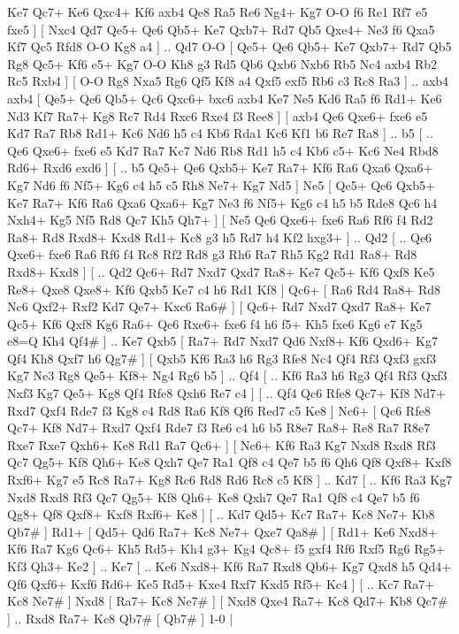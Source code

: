 Ke7  Qc7+ Ke6  Qxc4+ Kf6  axb4 Qe8  Ra5 Re6  Ng4+ Kg7  O-O f6  Re1 Rf7  e5 fxe5   ]  [  Nxc4 Qd7  Qe5+ Qe6  Qb5+ Ke7  Qxb7+ Rd7  Qb5 Qxe4+  Ne3 f6  Qxa5 Kf7  Qc5 Rfd8  O-O Kg8  a4   ] .. Qd7    O-O [  Qe5+ Qe6  Qb5+ Ke7  Qxb7+ Rd7  Qb5 Rg8  Qc5+ Kf6  e5+ Kg7  O-O Kh8  g3 Rd5  Qb6 Qxb6  Nxb6 Rb5  Nc4 axb4  Rb2 Rc5  Rxb4   ]  [  O-O Rg8  Nxa5 Rg6  Qf5 Kf8  a4 Qxf5  exf5 Rb6  c3 Rc8  Ra3   ] .. axb4    axb4 [  Qe5+ Qe6  Qb5+ Qc6  Qxc6+ bxc6  axb4 Ke7  Ne5 Kd6  Ra5 f6  Rd1+ Ke6  Nd3 Kf7  Ra7+ Kg8  Rc7 Rd4  Rxc6 Rxe4  f3 Ree8   ]  [  axb4 Qe6  Qxe6+ fxe6  e5 Kd7  Ra7 Rb8  Rd1+ Kc6  Nd6 h5  c4 Kb6  Rda1 Kc6  Kf1 b6  Re7 Ra8   ] .. b5 [ .. Qe6  Qxe6+ fxe6  e5 Kd7  Ra7 Kc7  Nd6 Rb8  Rd1 h5  c4 Kb6  c5+ Kc6  Ne4 Rbd8  Rd6+ Rxd6  exd6   ]  [ .. b5  Qe5+ Qe6  Qxb5+ Ke7  Ra7+ Kf6  Ra6 Qxa6  Qxa6+ Kg7  Nd6 f6  Nf5+ Kg6  c4 h5  c5 Rh8  Ne7+ Kg7  Nd5   ]  Ne5 [  Qe5+ Qe6  Qxb5+ Ke7  Ra7+ Kf6  Ra6 Qxa6  Qxa6+ Kg7  Ne3 f6  Nf5+ Kg6  c4 h5  b5 Rde8  Qc6 h4  Nxh4+ Kg5  Nf5 Rd8  Qc7 Kh5  Qh7+   ]  [  Ne5 Qe6  Qxe6+ fxe6  Ra6 Rf6  f4 Rd2  Ra8+ Rd8  Rxd8+ Kxd8  Rd1+ Kc8  g3 h5  Rd7 h4  Kf2 hxg3+   ] .. Qd2 [ .. Qe6  Qxe6+ fxe6  Ra6 Rf6  f4 Rc8  Rf2 Rd8  g3 Rh6  Ra7 Rh5  Kg2 Rd1  Ra8+ Rd8  Rxd8+ Kxd8   ]  [ .. Qd2  Qc6+ Rd7  Nxd7 Qxd7  Ra8+ Ke7  Qc5+ Kf6  Qxf8 Ke5  Re8+ Qxe8  Qxe8+ Kf6  Qxb5 Ke7  c4 h6  Rd1 Kf8   ]  Qc6+ [  Ra6 Rd4  Ra8+ Rd8  Nc6 Qxf2+  Rxf2 Kd7  Qe7+ Kxc6  Ra6#   ]  [  Qc6+ Rd7  Nxd7 Qxd7  Ra8+ Ke7  Qc5+ Kf6  Qxf8 Kg6  Ra6+ Qe6  Rxe6+ fxe6  f4 h6  f5+ Kh5  fxe6 Kg6  e7 Kg5  e8=Q Kh4  Qf4#   ] .. Ke7    Qxb5 [  Ra7+ Rd7  Nxd7 Qd6  Nxf8+ Kf6  Qxd6+ Kg7  Qf4 Kh8  Qxf7 h6  Qg7#   ]  [  Qxb5 Kf6  Ra3 h6  Rg3 Rfe8  Nc4 Qf4  Rf3 Qxf3  gxf3 Kg7  Ne3 Rg8  Qe5+ Kf8+  Ng4 Rg6  b5   ] .. Qf4 [ .. Kf6  Ra3 h6  Rg3 Qf4  Rf3 Qxf3  Nxf3 Kg7  Qe5+ Kg8  Qf4 Rfe8  Qxh6 Re7  c4   ]  [ .. Qf4  Qc6 Rfe8  Qc7+ Kf8  Nd7+ Rxd7  Qxf4 Rde7  f3 Kg8  c4 Rd8  Ra6 Kf8  Qf6 Red7  c5 Ke8   ]  Nc6+ [  Qc6 Rfe8  Qc7+ Kf8  Nd7+ Rxd7  Qxf4 Rde7  f3 Re6  c4 h6  b5 R8e7  Ra8+ Re8  Ra7 R8e7  Rxe7 Rxe7  Qxh6+ Ke8  Rd1 Ra7  Qc6+   ]  [  Nc6+ Kf6  Ra3 Kg7  Nxd8 Rxd8  Rf3 Qc7  Qg5+ Kf8  Qh6+ Ke8  Qxh7 Qe7  Ra1 Qf8  c4 Qe7  b5 f6  Qh6 Qf8  Qxf8+ Kxf8  Rxf6+ Kg7  e5 Rc8  Ra7+ Kg8  Rc6 Rd8  Rd6 Rc8  c5 Kf8   ] .. Kd7 [ .. Kf6  Ra3 Kg7  Nxd8 Rxd8  Rf3 Qc7  Qg5+ Kf8  Qh6+ Ke8  Qxh7 Qe7  Ra1 Qf8  c4 Qe7  b5 f6  Qg8+ Qf8  Qxf8+ Kxf8  Rxf6+ Ke8   ]  [ .. Kd7  Qd5+ Kc7  Ra7+ Kc8  Ne7+ Kb8  Qb7#   ]  Rd1+ [  Qd5+ Qd6  Ra7+ Kc8  Ne7+ Qxe7  Qa8#   ]  [  Rd1+ Ke6  Nxd8+ Kf6  Ra7 Kg6  Qc6+ Kh5  Rd5+ Kh4  g3+ Kg4  Qc8+ f5  gxf4 Rf6  Rxf5 Rg6  Rg5+ Kf3  Qh3+ Ke2   ] .. Kc7 [ .. Ke6  Nxd8+ Kf6  Ra7 Rxd8  Qb6+ Kg7  Qxd8 h5  Qd4+ Qf6  Qxf6+ Kxf6  Rd6+ Ke5  Rd5+ Kxe4  Rxf7 Kxd5  Rf5+ Kc4   ]  [ .. Kc7  Ra7+ Kc8  Ne7#   ]  Nxd8 [  Ra7+ Kc8  Ne7#   ]  [  Nxd8 Qxe4  Ra7+ Kc8  Qd7+ Kb8  Qc7#   ] .. Rxd8    Ra7+   Kc8   Qb7#    [  Qb7#   ] 1-0  |
